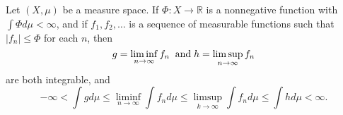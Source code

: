 \documentclass[12pt]{article}
\begin{document}
Let $(X,\mu)$ be a measure space. If $\Phi\colon X\to \mathbb{R}$ is a nonnegative function with $\int \Phi d\mu <\infty$, and if $f_1, f_2,\dots$ is a sequence of measurable functions such that $|f_n|\leq \Phi$ for each $n$, then 
\[g=\liminf_{n\rightarrow\infty} f_n \;\;\textnormal{and}\; 
h=\limsup_{n\rightarrow\infty} f_n\]
are both integrable, and 
\[-\infty < \int g d\mu\leq \liminf_{n\rightarrow\infty}\int f_nd\mu\leq
\limsup_{k\rightarrow\infty}\int f_n d\mu\leq \int h d\mu < \infty.\]
\end{document}
